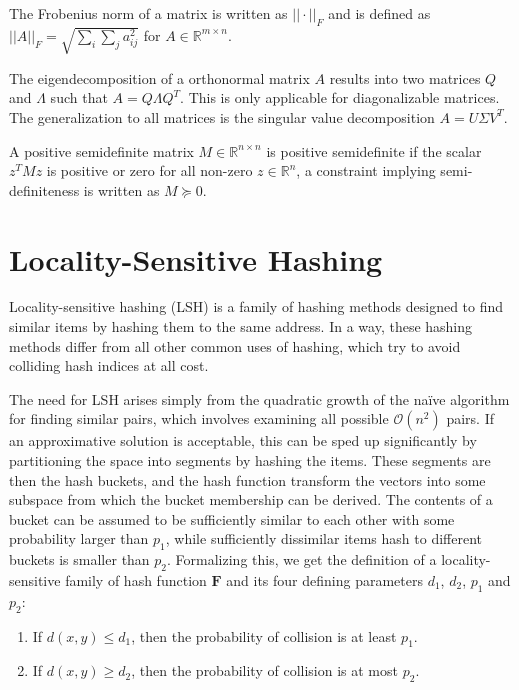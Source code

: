 The Frobenius norm of a matrix is written as $|| \cdot ||_F$ and is defined as
$|| A ||_F = \sqrt{\sum_i \sum_j  a_{ij}^2}$ for $A \in \mathbb{R}^{m \times n}$.

The eigendecomposition of a orthonormal matrix $A$ results into two matrices $Q$ and $\Lambda$
such that $A = Q\Lambda Q^T$. This is only applicable for diagonalizable matrices.
The generalization to all matrices is the singular value decomposition $A = U \Sigma V^T$.

A positive semidefinite matrix $M \in \mathbb{R}^{n \times n}$ is positive semidefinite
if the scalar $z^TMz$ is positive or zero for all non-zero $z \in \mathbb{R}^n$, a constraint
implying semi-definiteness is written as $M \succeq 0$.

\section{Locality-Sensitive Hashing}

Locality-sensitive hashing (LSH) is a family of hashing methods designed
to find similar items by hashing them to the same address. In a way, these
hashing methods differ from all other common uses of hashing, which try
to avoid colliding hash indices at all cost.

The need for LSH arises simply from the quadratic growth of the na\"ive
algorithm for finding similar pairs, which involves examining all possible
$\mathcal{O}(n^2)$ pairs. If an approximative solution is acceptable, this can
be sped up significantly by partitioning the space into segments by hashing the
items. These segments are then the hash buckets, and the hash function
transform the vectors into some subspace from which the bucket membership can
be derived. The contents of a bucket can be assumed to be sufficiently similar
to each other with some probability larger than $p_1$, while sufficiently
dissimilar items hash to different buckets is smaller than $p_2$. Formalizing
this, we get the definition of a locality-sensitive family of hash function
$\mathbf{F}$ and its four defining parameters $d_1$, $d_2$, $p_1$ and $p_2$:

\begin{enumerate}
  \item If $d(x, y) \leq d_1$, then the probability of collision is at least $p_1$.
  \item If $d(x, y) \geq d_2$, then the probability of collision is at most $p_2$.
\end{enumerate}

